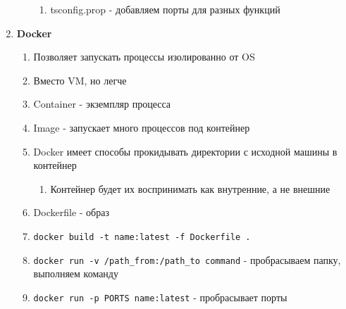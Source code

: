 \documentclass[a4paper, 12pt]{article}
\begin{document}
\begin{enumerate}
\begin{enumerate}
    \begin{enumerate}
      \item tsconfig.prop - добавляем порты для разных функций
    \end{enumerate}
  \end{enumerate} 
  \item \textbf{Docker}
  \begin{enumerate}
    \item Позволяет запускать процессы изолированно от OS 
    \item Вместо VM, но легче
    \item Container - экземпляр процесса
    \item Image - запускает много процессов под контейнер
    \item Docker имеет способы прокидывать директории с исходной машины в контейнер
    \begin{enumerate}
      \item Контейнер будет их воспринимать как внутренние, а не внешние
    \end{enumerate}
    \item Dockerfile - образ
    \item \verb+docker build -t name:latest -f Dockerfile .+
    \item \verb+docker run -v /path_from:/path_to command+ - пробрасываем папку, выполняем команду
    \item \verb+docker run -p PORTS name:latest+ - пробрасывает порты
  \end{enumerate}
\end{enumerate}
\end{document}

